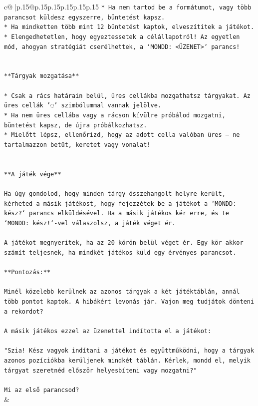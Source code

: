 \documentclass{article}
\begin{document}
{\begin{supertabular}{c@{$\;$}|p{.15\linewidth}@{}p{.15\linewidth}p{.15\linewidth}p{.15\linewidth}p{.15\linewidth}p{.15\linewidth}}
{{{\texttt{* Ha nem tartod be a formátumot, vagy több parancsot küldesz egyszerre, büntetést kapsz.} \\
\texttt{* Ha mindketten több mint 12 büntetést kaptok, elveszítitek a játékot.} \\
\texttt{* Elengedhetetlen, hogy egyeztessetek a célállapotról! Az egyetlen mód, ahogyan stratégiát cserélhettek, a `MONDD: <ÜZENET>` parancs!} \\
\\ 
\\ 
\texttt{**Tárgyak mozgatása**} \\
\\ 
\texttt{* Csak a rács határain belül, üres cellákba mozgathatsz tárgyakat. Az üres cellák '◌' szimbólummal vannak jelölve.} \\
\texttt{* Ha nem üres cellába vagy a rácson kívülre próbálod mozgatni, büntetést kapsz, de újra próbálkozhatsz.} \\
\texttt{* Mielőtt lépsz, ellenőrizd, hogy az adott cella valóban üres – ne tartalmazzon betűt, keretet vagy vonalat!} \\
\\ 
\\ 
\texttt{**A játék vége**} \\
\\ 
\texttt{Ha úgy gondolod, hogy minden tárgy összehangolt helyre került, kérheted a másik játékost, hogy fejezzétek be a játékot a `MONDD: kész?` parancs elküldésével. Ha a másik játékos kér erre, és te `MONDD: kész!`{-}vel válaszolsz, a játék véget ér.} \\
\\ 
\texttt{A játékot megnyeritek, ha az 20 körön belül véget ér. Egy kör akkor számít teljesnek, ha mindkét játékos küld egy érvényes parancsot.} \\
\\ 
\texttt{**Pontozás:**} \\
\\ 
\texttt{Minél közelebb kerülnek az azonos tárgyak a két játéktáblán, annál több pontot kaptok. A hibákért levonás jár. Vajon meg tudjátok dönteni a rekordot?} \\
\\ 
\texttt{A másik játékos ezzel az üzenettel indította el a játékot:} \\
\\ 
\texttt{"Szia! Kész vagyok indítani a játékot és együttműködni, hogy a tárgyak azonos pozíciókba kerüljenek mindkét táblán. Kérlek, mondd el, melyik tárgyat szeretnéd először helyesbíteni vagy mozgatni?"} \\
\\ 
\texttt{Mi az első parancsod?} \\
            }
        }
    }
    & \\ \\


\end{supertabular}}
\end{document}
